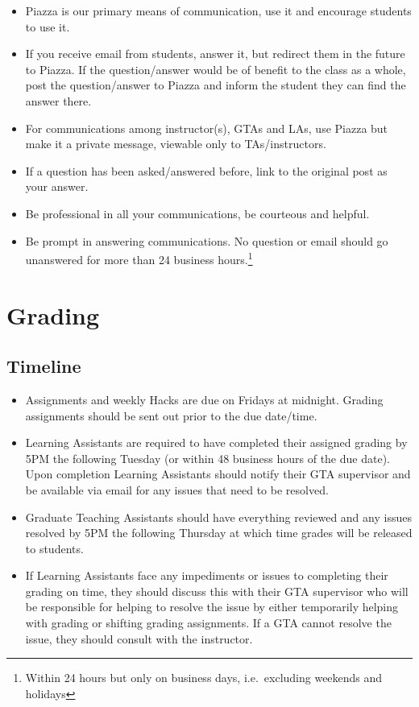 \documentclass[12pt]{scrartcl}
\begin{document}
\begin{itemize}
  \item Piazza is our primary means of communication, use it and encourage 
students to use it.  
  \item If you receive email from students, answer it, 
but redirect them in the future to Piazza.  If the question/answer
would be of benefit to the class as a whole, post the question/answer
to Piazza and inform the student they can find the answer there.
  \item For communications among instructor(s), GTAs and LAs, use Piazza but
make it a private message, viewable only to TAs/instructors.
  \item If a question has been asked/answered before, link to the original
  post as your answer.
  \item Be professional in all your communications, be courteous and
  helpful.  
  \item Be prompt in answering communications.  No question or email should go 
  unanswered for more than 24 business hours.\footnote{Within 24 hours but only
  on business days, i.e.\ excluding weekends and holidays}
\end{itemize}

\section*{Grading}

\subsection*{Timeline}

\begin{itemize}
  \item Assignments and weekly Hacks are due on Fridays at midnight.  
    Grading assignments should be sent out prior to the due date/time.
  \item Learning Assistants are required to have completed their assigned
    grading by 5PM the following Tuesday (or within 48 business hours of
    the due date).  Upon completion Learning
    Assistants should notify their GTA supervisor and be available via
    email for any issues that need to be resolved.
  \item Graduate Teaching Assistants should have everything reviewed and
    any issues resolved by 5PM the following Thursday at which time 
    grades will be released to students.
  \item If Learning Assistants face any impediments or issues to completing
    their grading on time, they should discuss this with their GTA supervisor
    who will be responsible for helping to resolve the issue by either 
    temporarily helping with grading or shifting grading assignments.  
    If a GTA cannot resolve the issue, they should consult with the 
    instructor.
\end{itemize}
\end{document}
